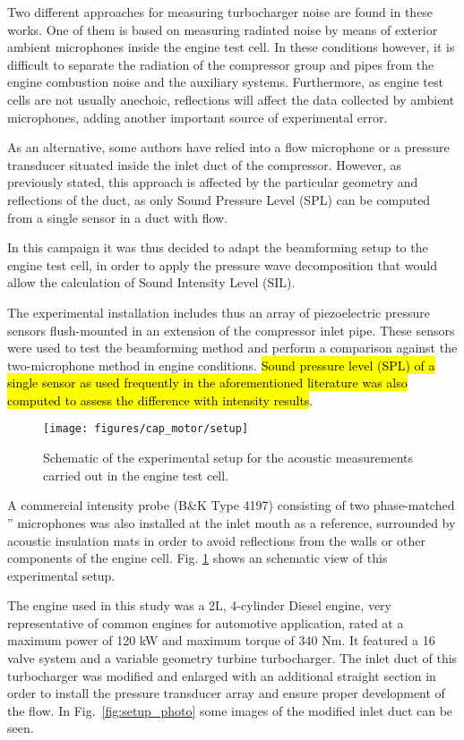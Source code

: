 Two different approaches for measuring turbocharger noise are found  in these works. One of them is based on measuring radiated noise by means of exterior ambient microphones inside the engine test cell. In these conditions however, it is difficult to separate the radiation of the compressor group and pipes from the engine combustion noise and the auxiliary systems. Furthermore, as engine test cells are not usually anechoic, reflections will affect the data collected by ambient microphones, adding another important source of experimental error.

As an alternative, some authors have relied into a flow microphone or a pressure transducer situated inside the inlet duct of the compressor. However, as previously stated, this approach is affected by the particular geometry and reflections of the duct, as only Sound Pressure Level (SPL) can be computed from a single sensor in a duct with flow.

In this campaign it was thus decided to adapt the beamforming setup to the engine test cell, in order to apply the pressure wave decomposition that would allow the calculation of Sound Intensity Level (SIL).

The experimental installation includes thus an array of piezoelectric pressure sensors flush-mounted in an extension of the compressor inlet pipe. These sensors were used to test the beamforming method and perform a comparison against the two-microphone method in engine conditions. \hl{Sound pressure level (SPL) of a single sensor as used frequently in the aforementioned literature was also computed to assess the difference with intensity results}.

\begin{figure}[t!]
\centering
\null\hspace{1cm}
\texttt{[image: figures/cap\_motor/setup]}
\null\hspace{1cm}
\caption{Schematic of the experimental setup for the acoustic measurements carried out in the engine test cell.}
\label{fig:setup}
\end{figure}

A commercial intensity probe (B\&K Type 4197) consisting of two phase-matched '' microphones was also installed at the inlet mouth as a reference, surrounded by acoustic insulation mats in order to avoid reflections from the walls or other components of the engine cell.  Fig. \ref{fig:setup} shows an schematic view of this  experimental setup.

The engine used in this study was a 2L, 4-cylinder Diesel engine, very representative of common engines for automotive application, rated at a maximum power of 120 kW and maximum torque of 340 Nm. It featured a 16 valve system and a variable geometry turbine turbocharger. The inlet duct of this turbocharger was modified and enlarged with an additional straight section in order to install the pressure transducer array and ensure proper development of the flow. In Fig.~\ref{fig:setup_photo} some images of the modified inlet duct can be seen.

